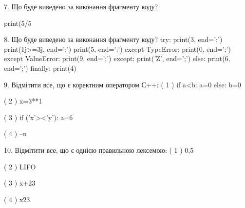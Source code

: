 \documentclass[11pt]{article}
\begin{document}
7. Що буде виведено за виконання фрагменту коду?

print(5/5%
\vspace{5mm}

8. Що буде виведено за виконання фрагменту коду?
try:
    print(3, end=';')
    print(1j>=3j, end=';')
    print(5, end=';')
except TypeError:
    print(0, end=';')
except ValueError:
    print(9, end=';')
except:
    print('Z', end=';')
else:
    print(6, end=';')
finally:
    print(4)
\vspace{5mm}

9. %
Відмітити все, що є коректним оператором С++:
( 1 ) if a<b: a=0 else: b=0

( 2 ) x=3**1

( 3 ) if ('x'><'y'): a=6

( 4 ) --n
\vspace{5mm}

10. %
Відмітити все, що є однією правильною лексемою:
( 1 ) 0,5

( 2 ) LIFO

( 3 ) x+23

( 4 ) x23
\vspace{5mm}

\newpage
\end{document}
